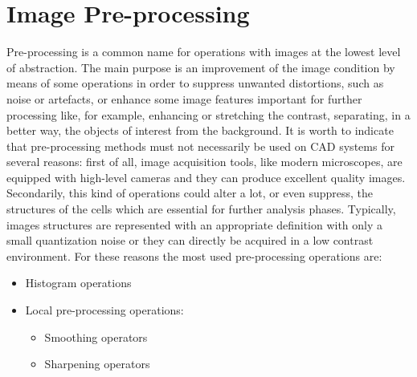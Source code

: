 \documentclass[final,a4paper,12pt,english]{UnicaPhdThesis3}
\begin{document}
	\chapter{Image Pre-processing}
	Pre-processing is a common name for operations with images at the lowest level of abstraction.
	The main purpose is an improvement of the image condition by means of some operations in order to suppress unwanted distortions, such as noise or artefacts, or enhance some image features important for further processing like, for example, enhancing or stretching the contrast, separating, in a better way, the objects of interest from the background.
	It is worth to indicate that pre-processing methods must not necessarily be used on CAD systems for several reasons: first of all, image acquisition tools, like modern microscopes, are equipped with high-level cameras and they can produce excellent quality images. Secondarily, this kind of operations could alter a lot, or even suppress, the structures of the cells which are essential for further analysis phases. Typically, images structures are represented with an appropriate definition with only a small quantization noise or they can directly be acquired in a low contrast environment. For these reasons the most used pre-processing operations are:
	\begin{itemize}
		\item Histogram operations
		\item Local pre-processing operations:
		\begin{itemize}
			\item Smoothing operators
			\item Sharpening operators
		\end{itemize}
	\end{itemize}
	
\end{document}

